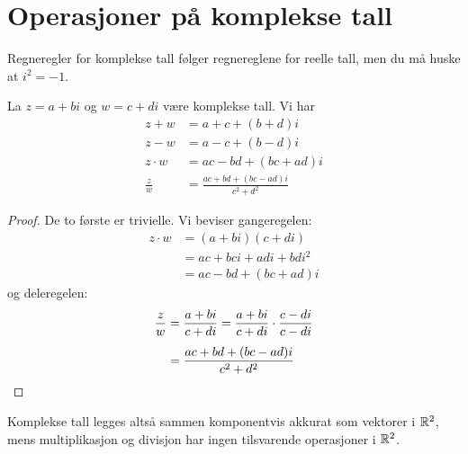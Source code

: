 \section*{Operasjoner på komplekse tall}
Regneregler for komplekse tall følger regnereglene for reelle tall, 
men du må huske at $i^2=-1$. 
\begin{tcolorbox}
\begin{thm}
La $z=a+bi$ og $w=c+di$ være komplekse tall. Vi har  
\begin{align*}
z+w&=a+c+(b+d)i \\[4pt]
z-w&=a-c+(b-d)i \\[4pt]
z\cdot w&=ac-bd+(bc+ad)i\\[4pt]
\frac{z}{w}&=\frac{ac+bd+(bc-ad)i}{c^2+d^2}
\end{align*}
\end{thm}
\vspace{1mm}
\end{tcolorbox}
\begin{proof}
De to første er trivielle. Vi beviser gangeregelen:
\begin{align*}
z\cdot w&=(a+bi)(c+di)\\
&= ac+bci+adi+bdi^2\\ 
&=ac-bd+(bc+ad)i
\end{align*}
og deleregelen:
\begin{align*}
\frac{z}{w}&=\frac{a+bi}{c+di}= \frac{a+bi}{c+di}\cdot \frac{c-di}{c-di}\\[4pt]
&=\frac{ac+bd+(bc-ad)i}{c^2+d^2} \qedhere
\end{align*}
\end{proof}

Komplekse tall legges altså sammen komponentvis akkurat som vektorer i $\mathbb{R}^2$, 
mens multiplikasjon og divisjon har ingen tilsvarende operasjoner i $\mathbb{R}^2$.


